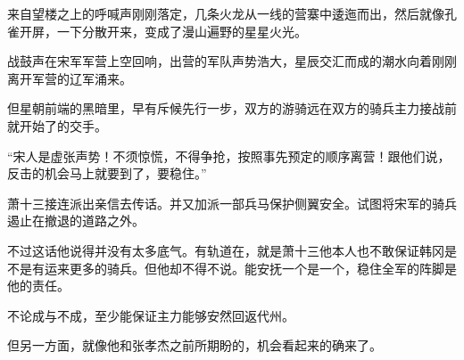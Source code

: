 来自望楼之上的呼喊声刚刚落定，几条火龙从一线的营寨中逶迤而出，然后就像孔雀开屏，一下分散开来，变成了漫山遍野的星星火光。

战鼓声在宋军军营上空回响，出营的军队声势浩大，星辰交汇而成的潮水向着刚刚离开军营的辽军涌来。

但星朝前端的黑暗里，早有斥候先行一步，双方的游骑远在双方的骑兵主力接战前就开始了的交手。

“宋人是虚张声势！不须惊慌，不得争抢，按照事先预定的顺序离营！跟他们说，反击的机会马上就要到了，要稳住。”

萧十三接连派出亲信去传话。并又加派一部兵马保护侧翼安全。试图将宋军的骑兵遏止在撤退的道路之外。

不过这话他说得并没有太多底气。有轨道在，就是萧十三他本人也不敢保证韩冈是不是有运来更多的骑兵。但他却不得不说。能安抚一个是一个，稳住全军的阵脚是他的责任。

不论成与不成，至少能保证主力能够安然回返代州。

但另一方面，就像他和张孝杰之前所期盼的，机会看起来的确来了。
